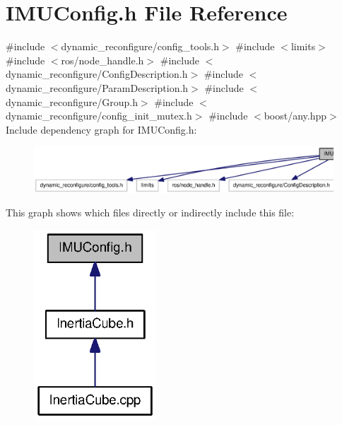 \section{\-I\-M\-U\-Config.\-h \-File \-Reference}
\label{IMUConfig_8h}
{\ttfamily \#include $<$dynamic\-\_\-reconfigure/config\-\_\-tools.\-h$>$}\*
{\ttfamily \#include $<$limits$>$}\*
{\ttfamily \#include $<$ros/node\-\_\-handle.\-h$>$}\*
{\ttfamily \#include $<$dynamic\-\_\-reconfigure/\-Config\-Description.\-h$>$}\*
{\ttfamily \#include $<$dynamic\-\_\-reconfigure/\-Param\-Description.\-h$>$}\*
{\ttfamily \#include $<$dynamic\-\_\-reconfigure/\-Group.\-h$>$}\*
{\ttfamily \#include $<$dynamic\-\_\-reconfigure/config\-\_\-init\-\_\-mutex.\-h$>$}\*
{\ttfamily \#include $<$boost/any.\-hpp$>$}\*
\-Include dependency graph for \-I\-M\-U\-Config.\-h\-:
\nopagebreak
\begin{figure}[H]
\begin{center}
\leavevmode
\includegraphics[width=350pt]{IMUConfig_8h__incl}
\end{center}
\end{figure}
\-This graph shows which files directly or indirectly include this file\-:
\nopagebreak
\begin{figure}[H]
\begin{center}
\leavevmode
\includegraphics[width=130pt]{IMUConfig_8h__dep__incl}
\end{center}
\end{figure}
